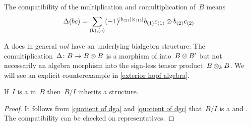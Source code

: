 \documentclass[a4paper,10pt,headings=standardclasses]{scrartcl}
\begin{document}
\begin{remark}
  The compatibility of the multiplication and comultiplication of~$B$ means
  \begin{gather*}
    \Delta(bc)
    =
    \sum_{(b), (c)}
    (-1)^{\lvert b_{(2)}\rvert \lvert c_{(1)}\rvert}
    b_{(1)} c_{(1)} \otimes b_{(2)} c_{(2)}
  \end{gather*}

\end{remark}


\begin{warning}
  A {\dgb} does in general \emph{not} have an underlying bialgebra structure:
  The comultiplication~$\Delta \colon B \to B \otimes B$ is a morphism of {\dgas} into~$B \otimes B'$ but not necessarily an algebra morphism into the sign-less tensor product~$B \otimes_k B$.
  We will see an explicit counterexample in \cref{exterior hopf algebra}.
\end{warning}


\begin{lemma}
  \label{quotient of dgb}
  If~$I$ is a {\dgbi} in~$B$ then~$B/I$ inherits a {\dgb} structure.
\end{lemma}

\begin{proof}
  It follows from \cref{quotient of dga} and \cref{quotient of dgc} that~$B/I$ is a {\dga} and {\dgc}.
  The compatibility can be checked on representatives.
\end{proof}
\end{document}
